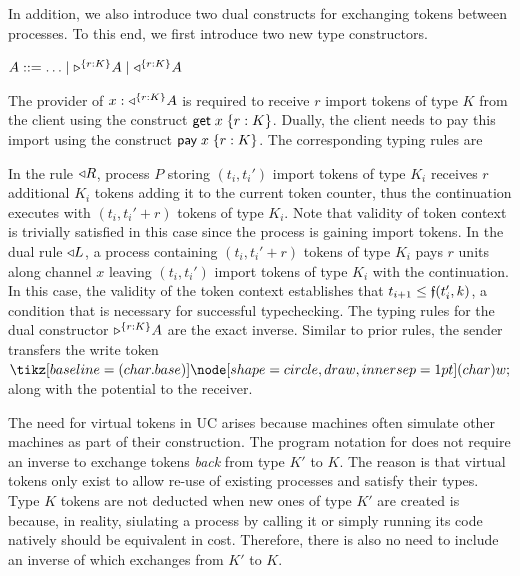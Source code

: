 In addition, we also introduce two dual constructs for exchanging tokens
between processes.
To this end, we first introduce two new type constructors.
\begin{center}
\begin{minipage}{0cm}
\begin{tabbing}
$A ::= \ldots \mid \tpaypot{A}{r : K} \mid \tgetpot{A}{r : K}$
\end{tabbing}
\end{minipage}
\end{center}
The provider of $x : \tgetpot{A}{r : K}$ is required to receive
$r$ import tokens of type $K$ from the client using the construct
$\eget{x}{r : K}$. Dually, the client needs to pay this import
using the construct $\epay{x}{r : K}$.
The corresponding typing rules are
In the rule $\getpot R$, process $P$ storing $(t_i, t_i')$ import tokens of type $K_i$
receives $r$ additional $K_i$ tokens adding it to the current token counter, thus
the continuation executes with $(t_i, t_i'+r)$ tokens of type $K_i$.
Note that validity of token context is trivially satisfied in this case since the
process is gaining import tokens.
%
In the dual rule $\getpot L$, a process containing $(t_i, t_i'+r)$ tokens of type $K_i$
pays $r$ units along channel $x$ leaving $(t_i, t_i')$ import tokens of type $K_i$ with
the continuation.
In this case, the validity of the token context establishes that $t_{i+1} \leq \GlobalF(t_i',k)$,
a condition that is necessary for successful typechecking.
The typing rules for the dual constructor $\tpaypot{A}{r : K}$
are the exact inverse.
Similar to prior rules, the sender transfers the write token $\wt$
along with the potential to the receiver.

The need for virtual tokens in UC arises because machines often simulate
other machines as part of their construction. The program notation for 
does not require an inverse to exchange tokens \textit{back} from type $K'$ to $K$.
The reason is that virtual tokens only exist to allow re-use of existing processes 
and satisfy their types. Type $K$ tokens are not deducted when new ones of type $K'$ 
are created is because, in reality, siulating a process by calling it or simply running
its code natively should be equivalent in cost. Therefore, there is also no need to 
include an inverse of  which exchanges from $K'$ to $K$.


